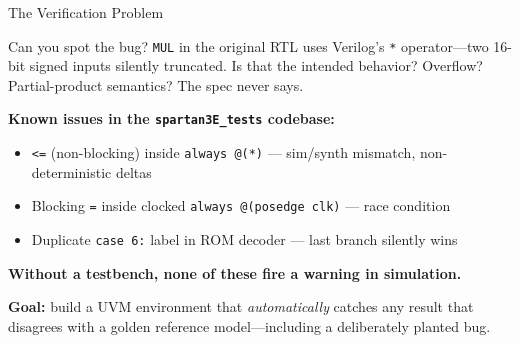 \documentclass[aspectratio=169]{beamer}
\begin{document}
\begin{frame}{The Verification Problem}
  \begin{alertblock}{Can you spot the bug?}
    \texttt{MUL} in the original RTL uses Verilog's \texttt{*} operator---two
    16-bit signed inputs silently truncated. Is that the intended behavior?
    Overflow? Partial-product semantics? The spec never says.
  \end{alertblock}

  \medskip
  \textbf{Known issues in the \texttt{spartan3E\_tests} codebase:}
  \begin{itemize}
    \item \texttt{<=} (non-blocking) inside \texttt{always @(*)} ---
          sim/synth mismatch, non-deterministic deltas
    \item Blocking \texttt{=} inside clocked \texttt{always @(posedge clk)} ---
          race condition
    \item Duplicate \texttt{case 6:} label in ROM decoder ---
          last branch silently wins
  \end{itemize}

  \medskip
  \textbf{Without a testbench, none of these fire a warning in simulation.}

  \medskip
  \textbf{Goal:} build a UVM environment that \emph{automatically} catches
  any result that disagrees with a golden reference model---including a
  deliberately planted bug.
\end{frame}
\end{document}

